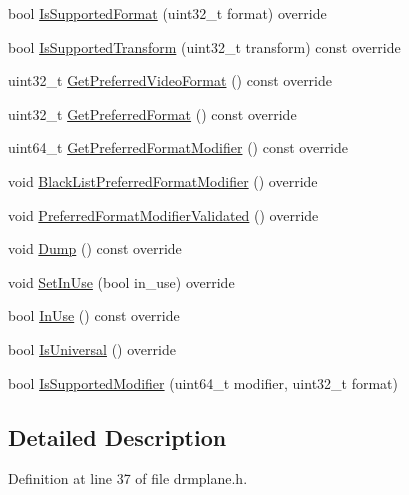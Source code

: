 \begin{DoxyCompactItemize}
bool \mbox{\hyperlink{classhwcomposer_1_1DrmPlane_a50940fd94a65453bd22d20011581796e}{Is\+Supported\+Format}} (uint32\+\_\+t format) override
\item 
bool \mbox{\hyperlink{classhwcomposer_1_1DrmPlane_ac3feae2eaa4adfb5678a47c835c2c2af}{Is\+Supported\+Transform}} (uint32\+\_\+t transform) const override
\item 
uint32\+\_\+t \mbox{\hyperlink{classhwcomposer_1_1DrmPlane_a061caae8c703189ae6d05dbe8b303f12}{Get\+Preferred\+Video\+Format}} () const override
\item 
uint32\+\_\+t \mbox{\hyperlink{classhwcomposer_1_1DrmPlane_a3bca39231ec7b099980474b279c58ce8}{Get\+Preferred\+Format}} () const override
\item 
uint64\+\_\+t \mbox{\hyperlink{classhwcomposer_1_1DrmPlane_a185538f3aca7f84830f75f23efe551d6}{Get\+Preferred\+Format\+Modifier}} () const override
\item 
void \mbox{\hyperlink{classhwcomposer_1_1DrmPlane_a6159712388e26258e14fcb3139d7cd19}{Black\+List\+Preferred\+Format\+Modifier}} () override
\item 
void \mbox{\hyperlink{classhwcomposer_1_1DrmPlane_a476d9d42a81eddb775bb285cc1c68cfb}{Preferred\+Format\+Modifier\+Validated}} () override
\item 
void \mbox{\hyperlink{classhwcomposer_1_1DrmPlane_abc9ca4823dfd433aa45747b8596cc673}{Dump}} () const override
\item 
void \mbox{\hyperlink{classhwcomposer_1_1DrmPlane_aed0ac04d949d6457dd638e121c3618d5}{Set\+In\+Use}} (bool in\+\_\+use) override
\item 
bool \mbox{\hyperlink{classhwcomposer_1_1DrmPlane_aeb8c1aecd933645e7e2743b149b06302}{In\+Use}} () const override
\item 
bool \mbox{\hyperlink{classhwcomposer_1_1DrmPlane_a25b4218371d1c5984777b74553b554a4}{Is\+Universal}} () override
\item 
bool \mbox{\hyperlink{classhwcomposer_1_1DrmPlane_a82a0274af9e3e94889e8df8dedbe3eea}{Is\+Supported\+Modifier}} (uint64\+\_\+t modifier, uint32\+\_\+t format)
\end{DoxyCompactItemize}


\subsection{Detailed Description}


Definition at line 37 of file drmplane.\+h.



